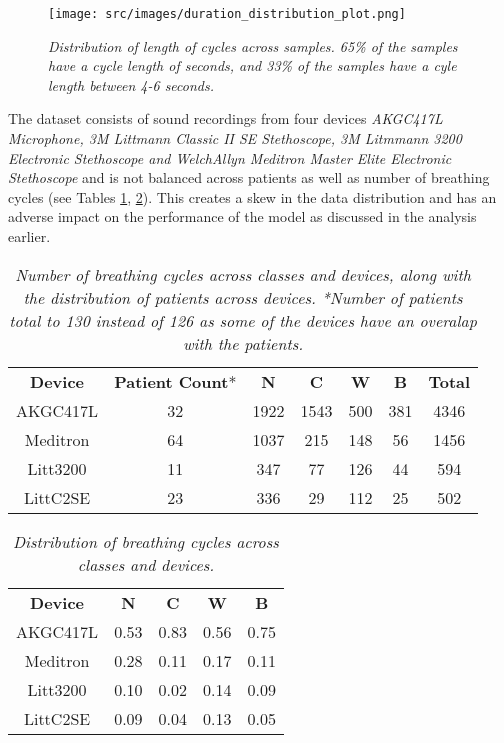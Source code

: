 \documentclass{article}
\begin{document}
\begin{figure}[!hbtp]
\begin{center}
    \centering
    \texttt{[image: src/images/duration\_distribution\_plot.png]}
\end{center}
\vspace{-8mm}
    \caption{\textit{Distribution of length of cycles across samples. 65\% of the samples have a cycle length of  seconds, and 33\% of the samples have a cyle length between 4-6 seconds.}} 
    \label{fig:dist_cycle_length}
\end{figure}

The dataset consists of sound recordings from four devices \textit{AKGC417L Microphone, 3M Littmann Classic II SE Stethoscope, 3M Litmmann 3200 Electronic Stethoscope and WelchAllyn Meditron Master Elite Electronic Stethoscope} and is not balanced across patients as well as number of breathing cycles (see Tables \ref{tab:cyles_class_device}, \ref{tab:per_class_device}). This creates a skew in the data distribution and has an adverse impact on the performance of the model as discussed in the analysis earlier.
\begin{table}[!htbp]
    \centering
    \small
    \begin{tabular}{c | c | c c c c c}
    \toprule
	\textbf{Device} & \multicolumn{1}{m{1cm}|}{\textbf{Patient Count}*} & \textbf{N} & \textbf{C} & \textbf{W}	& \textbf{B} & \textbf{Total}\\
    \cmidrule(lr){1-1}
    \cmidrule(lr){2-2}
    \cmidrule(lr){3-7}
    AKGC417L & 32 & 1922 & 1543 & 500 & 381 & 4346\\
    Meditron & 64 & 1037 & 215 & 148 & 56 & 1456\\	
    Litt3200 & 11 & 347 & 77 & 126 & 44 & 594\\
    LittC2SE & 23 & 336 & 29 & 112 & 25 & 502\\
    \bottomrule
    \end{tabular}
    \caption{\textit{Number of breathing cycles across classes and devices, along with the distribution of patients across devices.
    \newline
    *Number of patients total to 130 instead of 126 as some of the devices have an overalap with the patients.}
    }
    \label{tab:cyles_class_device}
\end{table}


\begin{table}[!htbp]
    \centering
    \begin{tabular}{c | c c c c}
    \toprule
	\textbf{Device} & \textbf{N} & \textbf{C} & \textbf{W}	& \textbf{B}\\
    \cmidrule(lr){1-1}
    \cmidrule(lr){2-5}
	AKGC417L & 0.53 & 0.83 & 0.56 & 0.75\\
    Meditron & 0.28 & 0.11 & 0.17 & 0.11\\
	Litt3200 & 0.10 & 0.02 & 0.14 & 0.09\\
	LittC2SE & 0.09 & 0.04 & 0.13	& 0.05\\
    \bottomrule
    \end{tabular}
    \caption{\textit{Distribution of breathing cycles across classes and devices.}}
    \label{tab:per_class_device}
\end{table}
 
\end{document}
